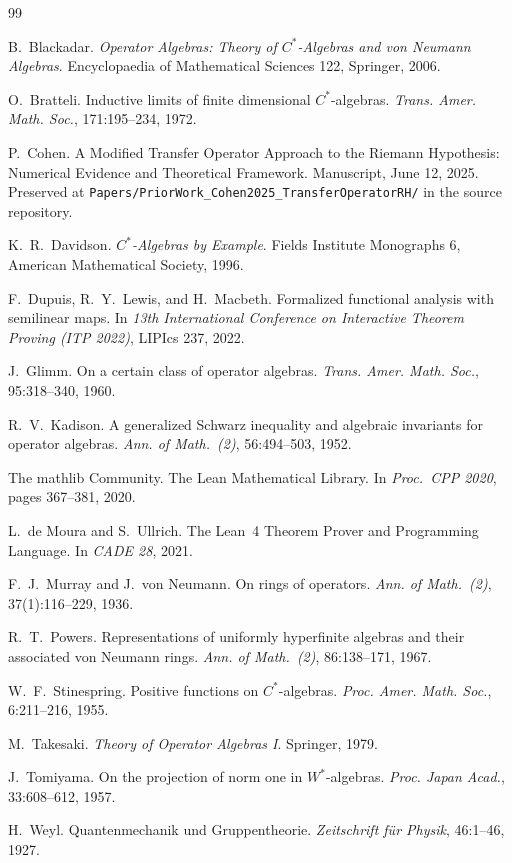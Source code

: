\documentclass[11pt,a4paper]{amsart}
\theoremstyle{plain}
\theoremstyle{definition}
\begin{document}
\begin{thebibliography}{99}

B.~Blackadar.
\newblock \emph{Operator Algebras: Theory of $C^*$-Algebras and von Neumann Algebras}.
\newblock Encyclopaedia of Mathematical Sciences 122, Springer, 2006.

O.~Bratteli.
\newblock Inductive limits of finite dimensional $C^*$-algebras.
\newblock \emph{Trans. Amer. Math. Soc.}, 171:195--234, 1972.

P.~Cohen.
\newblock A Modified Transfer Operator Approach to the Riemann Hypothesis: Numerical Evidence and Theoretical Framework.
\newblock Manuscript, June 12, 2025. Preserved at \texttt{Papers/PriorWork\_Cohen2025\_TransferOperatorRH/} in the source repository.

K.~R.~Davidson.
\newblock \emph{$C^*$-Algebras by Example}.
\newblock Fields Institute Monographs 6, American Mathematical Society, 1996.

F.~Dupuis, R.~Y.~Lewis, and H.~Macbeth.
\newblock Formalized functional analysis with semilinear maps.
\newblock In \emph{13th International Conference on Interactive Theorem Proving (ITP 2022)}, LIPIcs 237, 2022.

J.~Glimm.
\newblock On a certain class of operator algebras.
\newblock \emph{Trans. Amer. Math. Soc.}, 95:318--340, 1960.

R.~V.~Kadison.
\newblock A generalized Schwarz inequality and algebraic invariants for operator algebras.
\newblock \emph{Ann. of Math.~(2)}, 56:494--503, 1952.

The mathlib Community.
\newblock The Lean Mathematical Library.
\newblock In \emph{Proc.\ CPP 2020}, pages 367--381, 2020.

L.~de Moura and S.~Ullrich.
\newblock The Lean~4 Theorem Prover and Programming Language.
\newblock In \emph{CADE 28}, 2021.

F.~J.~Murray and J.~von Neumann.
\newblock On rings of operators.
\newblock \emph{Ann. of Math.~(2)}, 37(1):116--229, 1936.

R.~T.~Powers.
\newblock Representations of uniformly hyperfinite algebras and their associated von Neumann rings.
\newblock \emph{Ann. of Math.~(2)}, 86:138--171, 1967.

W.~F.~Stinespring.
\newblock Positive functions on $C^*$-algebras.
\newblock \emph{Proc. Amer. Math. Soc.}, 6:211--216, 1955.

M.~Takesaki.
\newblock \emph{Theory of Operator Algebras I}.
\newblock Springer, 1979.

J.~Tomiyama.
\newblock On the projection of norm one in $W^*$-algebras.
\newblock \emph{Proc. Japan Acad.}, 33:608--612, 1957.

H.~Weyl.
\newblock Quantenmechanik und Gruppentheorie.
\newblock \emph{Zeitschrift f\"ur Physik}, 46:1--46, 1927.

\end{thebibliography}
\end{document}
